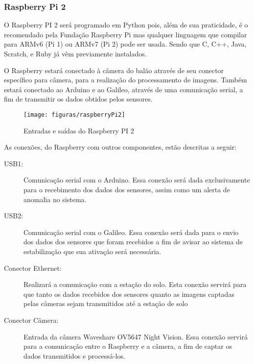 	\subsubsection{Raspberry Pi 2}

		O Raspberry PI 2 será programado em Python pois, além de sua praticidade, é o recomendado pela Fundação Raspberry Pi mas qualquer linguagem que compilar para ARMv6 (Pi 1) ou ARMv7 (Pi 2) pode ser usada. Sendo que C, C++, Java, Scratch, e Ruby já vêm previamente instalados.~\cite{raspberrypi}

		O Raspberry estará conectado à câmera do balão através de seu conector específico para câmera, para a realização do processamento de imagens. Também estará conectado ao Arduino e ao Galileo, através de uma comunicação serial, a fim de transmitir os dados obtidos pelos sensores.

		\begin{figure}[H]
			\centering
			\caption[Entradas e saídas do Raspberry Pi 2]{Entradas e saídas do Raspberry PI 2~\cite{filipeflop}}
			\label{img:raspberryPi2}
			\texttt{[image: figuras/raspberryPi2]}
		\end{figure}

		As conexões, do Raspberry com outros componentes, estão descritas a seguir:
		\begin{description}
			\item[USB1:] Comunicação serial com o Arduino. Essa conexão será dada exclusivamente para o recebimento dos dados dos sensores, assim como um alerta de anomalia no sistema.
			\item[USB2:] Comunicação serial com o Galileo. Essa conexão será dada para o envio dos dados dos sensores que foram recebidos a fim de avisar ao sistema de estabilização que sua ativação será necessária.
			\item[Conector Ethernet:] Realizará a comunicação com a estação do solo. Esta conexão servirá para que tanto os dados recebidos dos sensores quanto as imagens captadas pelas câmeras sejam transmitidos até a estação de solo
			\item[Conector Câmera:] Entrada da câmera Waveshare OV5647 Night Vision. Essa conexão servirá para a comunicação entre o Raspberry e a câmera, a fim de captar os dados transmitidos e processá-los.
		\end{description}

